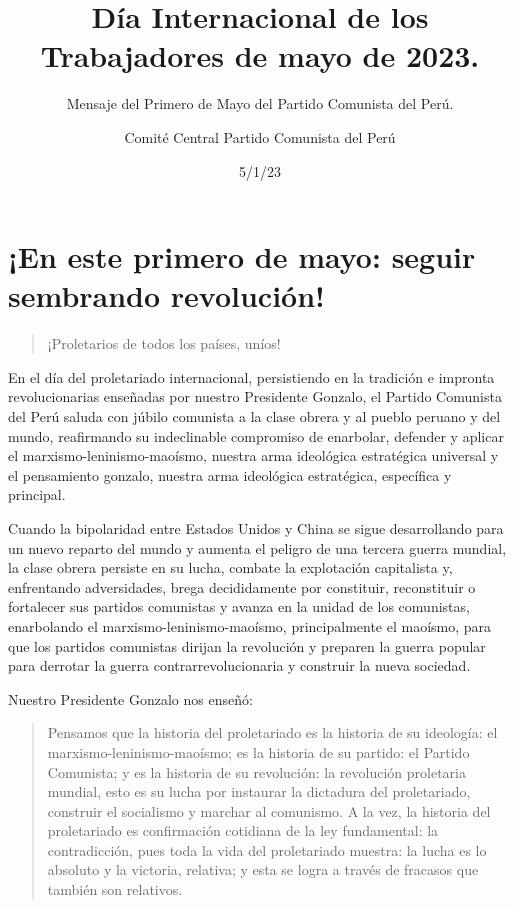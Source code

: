 \documentclass[
  a4paper,
]{article}
\title{Día Internacional de los Trabajadores de mayo de 2023.}
\subtitle{Mensaje del Primero de Mayo del Partido Comunista del Perú.}
\author{Comité Central Partido Comunista del Perú}
\date{5/1/23}
\renewcommand*\contentsname{Table of contents}
\newcommand\contentsname{Table of contents}
\begin{document}
\maketitle
\ifdefined\Shaded\renewenvironment{Shaded}{\begin{tcolorbox}[interior hidden, boxrule=0pt, breakable, borderline west={3pt}{0pt}{shadecolor}, enhanced, frame hidden, sharp corners]}{\end{tcolorbox}}\fi

\renewcommand*\contentsname{Contenidos}
{
\hypersetup{linkcolor=}
\setcounter{tocdepth}{3}
\tableofcontents
}
\listoffigures
\listoftables
\hypertarget{en-este-primero-de-mayo-seguir-sembrando-revoluciuxf3n}{%
\section{¡En este primero de mayo: seguir sembrando
revolución!}\label{en-este-primero-de-mayo-seguir-sembrando-revoluciuxf3n}}

\begin{quote}
¡Proletarios de todos los países, uníos!
\end{quote}

En el día del proletariado internacional, persistiendo en la tradición e
impronta revolucionarias enseñadas por nuestro Presidente Gonzalo, el
Partido Comunista del Perú saluda con júbilo comunista a la clase obrera
y al pueblo peruano y del mundo, reafirmando su indeclinable compromiso
de enarbolar, defender y aplicar el marxismo-leninismo-maoísmo, nuestra
arma ideológica estratégica universal y el pensamiento gonzalo, nuestra
arma ideológica estratégica, específica y principal.

Cuando la bipolaridad entre Estados Unidos y China se sigue
desarrollando para un nuevo reparto del mundo y aumenta el peligro de
una tercera guerra mundial, la clase obrera persiste en su lucha,
combate la explotación capitalista y, enfrentando adversidades, brega
decididamente por constituir, reconstituir o fortalecer sus partidos
comunistas y avanza en la unidad de los comunistas, enarbolando el
marxismo-leninismo-maoísmo, principalmente el maoísmo, para que los
partidos comunistas dirijan la revolución y preparen la guerra popular
para derrotar la guerra contrarrevolucionaria y construir la nueva
sociedad.

Nuestro Presidente Gonzalo nos enseñó:

\begin{quote}
Pensamos que la historia del proletariado es la historia de su
ideología: el marxismo-leninismo-maoísmo; es la historia de su partido:
el Partido Comunista; y es la historia de su revolución: la revolución
proletaria mundial, esto es su lucha por instaurar la dictadura del
proletariado, construir el socialismo y marchar al comunismo. A la vez,
la historia del proletariado es confirmación cotidiana de la ley
fundamental: la contradicción, pues toda la vida del proletariado
muestra: la lucha es lo absoluto y la victoria, relativa; y esta se
logra a través de fracasos que también son relativos.
\end{quote}
\end{document}
